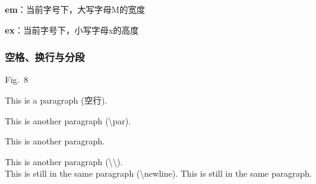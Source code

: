 \documentclass{ctexart}
\begin{document}
            \textbf{em}：当前字号下，大写字母M的宽度

            \textbf{ex}：当前字号下，小写字母x的高度


        \subsubsection{空格、换行与分段}
            Fig.~8

            This is a paragraph (空行). 
            
            This is another paragraph (\textbackslash par). 
            \par This is another paragraph. 

            \mbox{}

            This is another paragraph (\textbackslash \textbackslash).\\ %
            This is still in the same paragraph (\textbackslash newline).\newline %
            This is still in the same paragraph.
            
\end{document}
